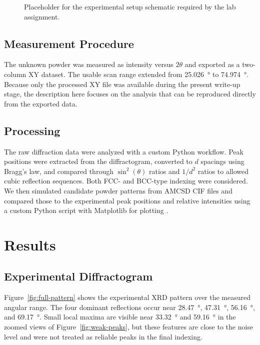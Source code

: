 \documentclass[11pt,a4paper]{article}
\begin{document}
\begin{figure}[H]
  \centering
  \caption{Placeholder for the experimental setup schematic required by the lab assignment.}
  \label{fig:setup-placeholder}
\end{figure}

\subsection{Measurement Procedure}
The unknown powder was measured as intensity versus $2\theta$ and exported as a two-column XY dataset. The usable scan range extended from \SI{25.026}{\degree} to \SI{74.974}{\degree}. Because only the processed XY file was available during the present write-up stage, the description here focuses on the analysis that can be reproduced directly from the exported data.

\subsection{Processing}
The raw diffraction data were analyzed with a custom Python workflow. Peak positions were extracted from the diffractogram, converted to $d$ spacings using Bragg's law, and compared through $\sin^2(\theta)$ ratios and $1/d^2$ ratios to allowed cubic reflection sequences. Both FCC- and BCC-type indexing were considered. We then simulated candidate powder patterns from AMCSD CIF files and compared those to the experimental peak positions and relative intensities using a custom Python script with Matplotlib for plotting \citep{downs2003,amcsd,python,hunter2007}.

\section{Results}
\subsection{Experimental Diffractogram}
Figure~\ref{fig:full-pattern} shows the experimental XRD pattern over the measured angular range. The four dominant reflections occur near \SI{28.47}{\degree}, \SI{47.31}{\degree}, \SI{56.16}{\degree}, and \SI{69.17}{\degree}. Small local maxima are visible near \SI{33.32}{\degree} and \SI{59.16}{\degree} in the zoomed views of Figure~\ref{fig:weak-peaks}, but these features are close to the noise level and were not treated as reliable peaks in the final indexing.
\end{document}
